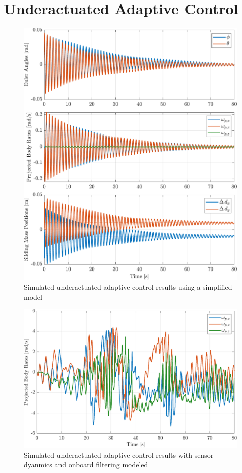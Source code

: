 \section{Underactuated Adaptive Control}

\begin{figure}[ht]
    \centering
    \includegraphics[width=\linewidth]{plots/adaptive_sim_success.pdf}
    \caption{Simulated underactuated adaptive control results using a simplified model}
\end{figure}

\begin{figure}[ht]
    \centering
    \includegraphics[width=\linewidth]{plots/adaptive_sim_failure.pdf}
    \caption{Simulated underactuated adaptive control results with sensor dyanmics and onboard filtering modeled}
\end{figure}

